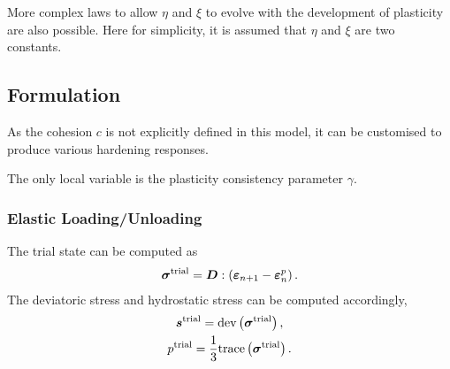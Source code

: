 More complex laws to allow $\eta$ and $\xi$ to evolve with the development of plasticity are also possible. Here for simplicity, it is assumed that $\eta$ and $\xi$ are two constants.
\subsection{Formulation}
As the cohesion $c$ is not explicitly defined in this model, it can be customised to produce various hardening responses.

The only local variable is the plasticity consistency parameter $\gamma$.
\subsubsection{Elastic Loading/Unloading}
The trial state can be computed as
\begin{gather}
\bm{\sigma}^\text{trial}=\bm{D}:\left(\bm{\varepsilon}_{n+1}-\bm{\varepsilon}^p_n\right).
\end{gather}
The deviatoric stress and hydrostatic stress can be computed accordingly,
\begin{gather}
\bm{s}^\text{trial}=\text{dev}\left(\bm{\sigma}^\text{trial}\right),\\
p^\text{trial}=\dfrac{1}{3}\text{trace}\left(\bm{\sigma}^\text{trial}\right).
\end{gather}
